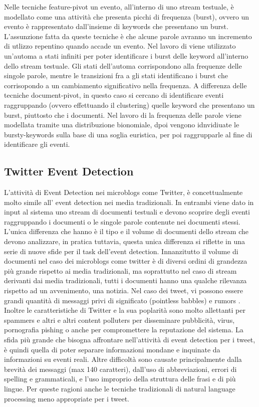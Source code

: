 \documentclass[a4paper,12pt]{report}
\begin{document}
Nelle tecniche feature-pivot un evento, all'interno di uno stream testuale, è modellato come una attività che presenta picchi di frequenza (burst), ovvero un evento è rappresentato dall'insieme di keywords che presentano un burst\cite{Kleinberg:2002:BHS:775047.775061}. L'assunzione fatta da queste tecniche è che alcune parole avranno un incremento di utlizzo repentino quando accade un evento. Nel lavoro di \cite{Kleinberg:2002:BHS:775047.775061} viene utilizzato un'automa a stati infiniti per poter identificare i burst delle keyword all'interno dello stream testuale. Gli stati dell'automa corrispondono alla frequenze delle singole parole, mentre le transizioni fra a gli stati identificano i burst che corrisopondo a un  cambiamento significativo nella frequenza.
A differenza delle tecniche document-pivot, in questo caso si cercano di identificare eventi raggruppando (ovvero effettuando il clustering)   quelle keyword che presentano un burst, piuttosto che i documenti. Nel lavoro di \cite{Allan:2002:TDT:772260} la frequenza delle parole viene modellata tramite una distribuzione bionomiale, dpoi vengono idnvidiuate le bursty-keywords sulla base di una soglia euristica, per poi raggrupparle al fine di identificare gli eventi.
\subsection{Twitter Event Detection }
L'attività di Event Detection nei microblogs come Twitter, è concettualmente molto simile all' event detection nei media tradizionali. In entrambi viene dato in input al sistema  uno stream di documenti testuali e devono scoprire degli eventi raggruppando i documenti o le singole parole contenute nei documenti stessi. L'unica differenza che hanno è il tipo e il volume di documenti dello stream che devono analizzare, in pratica tuttavia, questa unica differenza si riflette in una serie di nuove sfide per il task dell'event detection. 
Innanzitutto il volume di documenti nel caso dei microblogs come twitter  è di diversi ordini di grandezza più grande rispetto ai media tradizionali, ma soprattutto nel caso di stream derivanti dai media tradizionali, tutti i documenti hanno una qualche rilevanza rispetto ad un avvenimento, una notizia. Nel caso dei tweet, vi possono essere grandi quantità di messaggi privi di significato (pointless babbles) \cite{DBLP:conf/icwsm/HurlockW11} e rumors \cite{Castillo:2011:ICT:1963405.1963500}. Inoltre le caratteristiche di Twitter e la sua poplarità sono molto allettanti per spammers e altri e altri content polluters \cite{DBLP:conf/icwsm/LeeEC11} per disseminare pubblicità, virus, pornografia pishing o anche per compromettere la reputazione del sistema. La sfida più grande che bisogna affrontare nell'attività di event detection per i tweet, è quindi quella di poter separare informazioni mondane e inquinate da informazioni su eventi reali. Altre difficoltà sono causate principalmente dalla brevità dei messaggi (max 140 caratteri), dall'uso di abbreviazioni, errori di spelling e grammaticali, e l'uso improprio della struttura delle frasi e di più lingue. Per queste ragioni anche le tecniche tradizionali di natural language processing  meno appropriate per i tweet. 

 \printbibliography
\end{document}
